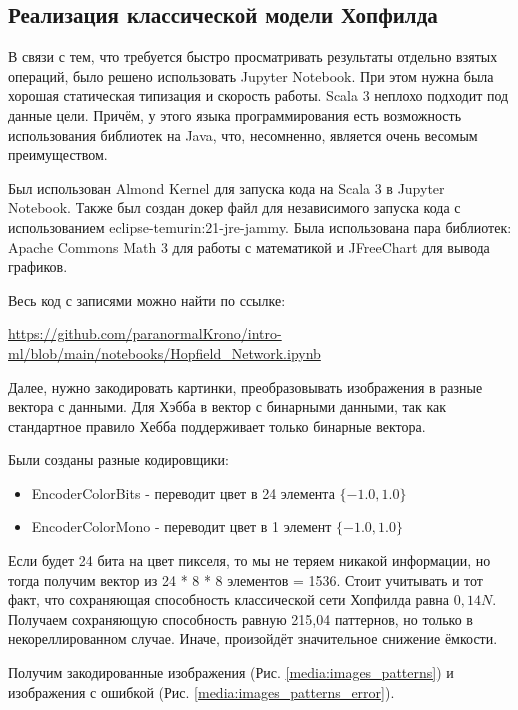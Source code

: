 
\subsection{\texorpdfstring{\textbf{
      Реализация классической модели Хопфилда}}
  {Реализация классической модели Хопфилда}}

В связи с тем, что требуется быстро просматривать результаты
отдельно взятых операций, было решено использовать Jupyter Notebook.
При этом нужна была хорошая статическая типизация и скорость работы.
Scala 3 неплохо подходит под данные цели. Причём, у этого
языка программирования есть возможность использования библиотек
на Java, что, несомненно, является очень весомым преимуществом.

Был использован Almond Kernel \cite{almond_opt}
для запуска кода на Scala 3 в Jupyter Notebook. Также был создан докер
файл для независимого запуска кода с использованием
eclipse-temurin:21-jre-jammy. Была использована пара библиотек: Apache
Commons Math 3 \cite{apache_commons_math}
для работы с математикой и JFreeChart \cite{jfreechart}
для вывода графиков.

Весь код с записями можно найти по ссылке:

\url{https://github.com/paranormalKrono/intro-ml/blob/main/notebooks/Hopfield_Network.ipynb}

Далее, нужно закодировать картинки, преобразовывать изображения
в разные вектора с данными. Для Хэбба в вектор с бинарными данными,
так как стандартное правило Хебба поддерживает только бинарные вектора.

Были созданы разные кодировщики:
\begin{itemize}
  \item EncoderColorBits - переводит цвет в 24 элемента \(\{-1.0,1.0\}\)
  \item EncoderColorMono - переводит цвет в 1 элемент \(\{-1.0,1.0\}\)
\end{itemize}

Если будет 24 бита на цвет пикселя, то мы не теряем
никакой информации, но тогда получим вектор из 24 * 8 * 8
элементов = 1536. Стоит учитывать и тот факт, что сохраняющая способность
классической сети Хопфилда равна \(0,14N\). Получаем сохраняющую способность
равную 215,04 паттернов, но только в некореллированном случае. Иначе,
произойдёт значительное снижение ёмкости.

Получим закодированные изображения (Рис. \ref{media:images_patterns})
и изображения с ошибкой (Рис. \ref{media:images_patterns_error}).

